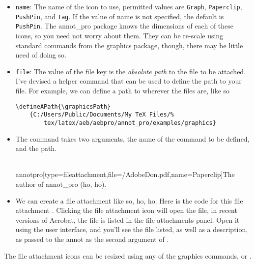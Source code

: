 \documentclass[12pt]{article}
\begin{document}
\begin{itemize}
    \item\texttt{name}: The name of the icon to use, permitted values are
    \texttt{Graph}, \texttt{Paperclip}, \texttt{PushPin}, and \texttt{Tag}. If the value of name is not
    specified, the default is \texttt{PushPin}. The annot\_pro package knows the dimensions of each of these
    icons, so you need not worry about them. They can be re-scale using standard commands from the graphics package,
    though, there may be little need of doing so.
    \item \texttt{file}: The value of the file key is the \emph{absolute path} to the file to be attached. I've
    devised a helper command  that can be used to define the path to your file. For example, we can
    define a path to wherever the files are, like so
\begin{Verbatim}[fontsize=\footnotesize]
  \defineAPath{\graphicsPath}
    {C:/Users/Public/Documents/My TeX Files/%
        tex/latex/aeb/aebpro/annot_pro/examples/graphics}
\end{Verbatim}
\item[] The command takes two arguments, the name of the command to be defined, and the path.


\begin{defineJS}{\fa}
\\annotpro[type=fileattachment,file={\graphicsPath/AdobeDon.pdf},name=Paperclip]{The author of annot\_pro (ho, ho).}
\end{defineJS}

\item[] We can create a file attachment
     like so, ho, ho. Here is the code
    for this file attachment \annotpro[name=Star]{\fa}. Clicking the
    file attachment icon will open the file, in recent versions of
    Acrobat, the file is listed in the file attachments panel. Open it
    using the user interface, and you'll see the file listed, as well
    as a description, as passed to the annot as the second argument of
    .
\end{itemize}

The file attachment icons can be resized using any of the graphics commands,  or .
\end{document}
